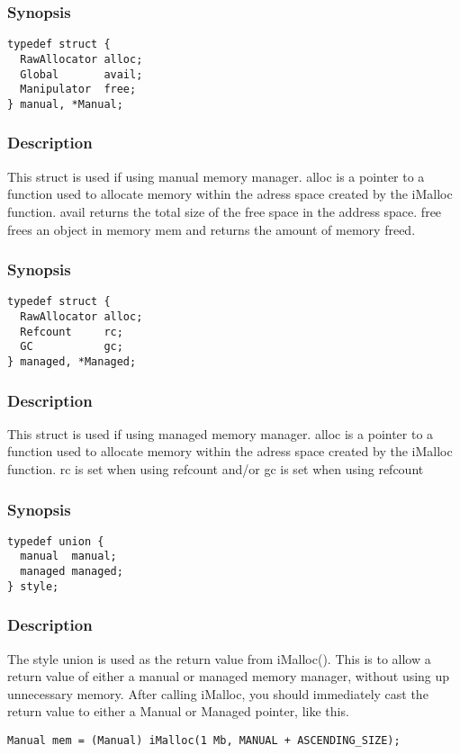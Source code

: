 \subsubsection*{Synopsis}
\begin{verbatim}
typedef struct {
  RawAllocator alloc;
  Global       avail;
  Manipulator  free;
} manual, *Manual; 
\end{verbatim}
\subsubsection*{Description}
This struct is used if using manual memory manager.
alloc is a pointer to a function used to allocate memory within the adress space created by the iMalloc function.
avail returns the total size of the free space in the address space.
free frees an object in memory mem and returns the amount of memory freed.

\subsubsection*{Synopsis}
\begin{verbatim}
typedef struct {
  RawAllocator alloc;
  Refcount     rc;
  GC           gc;
} managed, *Managed;
\end{verbatim}
\subsubsection*{Description}
This struct is used if using managed memory manager.
alloc is a pointer to a function used to allocate memory within the adress space created by the iMalloc function.
rc is set when using refcount and/or gc is set when using refcount

\subsubsection*{Synopsis}
\begin{verbatim}
typedef union {
  manual  manual;
  managed managed;
} style;
\end{verbatim}
\subsubsection*{Description}
The style union is used as the return value from iMalloc(). This is to allow a return value of either a manual or managed memory manager, without using up unnecessary memory.
After calling iMalloc, you should immediately cast the return value to either a Manual or Managed pointer, like this.
\begin{verbatim}
Manual mem = (Manual) iMalloc(1 Mb, MANUAL + ASCENDING_SIZE);
\end{verbatim}

